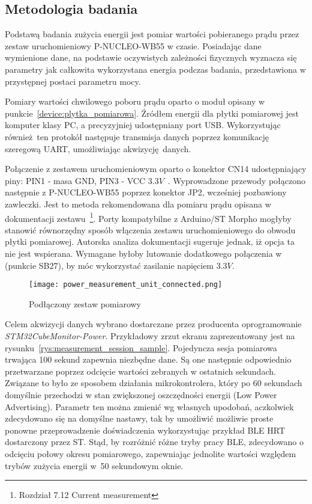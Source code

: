 \subsection{Metodologia badania}

Podstawą badania zużycia energii jest pomiar wartości pobieranego prądu przez zestaw uruchomieniowy
P-NUCLEO-WB55 w czasie. Posiadając dane wymienione dane, na podstawie oczywistych
zależności fizycznych wyznacza się parametry jak całkowita wykorzystana energia
podczas badania, przedstawiona w przystępnej postaci parametru mocy.

Pomiary wartości chwilowego poboru prądu oparto o moduł opisany w punkcie~\ref{device:plytka_pomiarowa}.
Źródłem energii dla płytki pomiarowej jest komputer klasy PC, a precyzyjniej udostępniany
port USB. Wykorzystując również ten protokół następuje transmisja danych poprzez komunikację szeregową
UART, umożliwiając akwizycję danych.

Połączenie z zestawem uruchomieniowym oparto o konektor CN14 udostępniający piny: PIN1 - masa GND, PIN3 - VCC $3.3V$~\cite{noauthor_um2243_2018}.
Wyprowadzone przewody połączono następnie z P-NUCLEO-WB55 poprzez konektor JP2, wcześniej pozbawiony zawleczki.
Jest to metoda rekomendowana dla pomiaru prądu opisana w dokumentacji zestawu~\cite{stmicroelectronics_um2435_2019}\footnote{
Rozdział 7.12 Current measurement}. Porty kompatybilne z Arduino/ST Morpho mogłyby stanowić równorzędny sposób
włączenia zestawu uruchomieniowego do obwodu płytki pomiarowej. Autorska analiza dokumentacji sugeruje jednak,
iż opcja ta nie jest wspierana. Wymagane byłoby lutowanie dodatkowego połączenia w (punkcie SB27), by móc wykorzystać
zasilanie napięciem $3.3V$.

\begin{figure}[!ht]
	\centering \texttt{[image: power\_measurement\_unit\_connected.png]}
	\caption{Podłączony zestaw pomiarowy}
	\label{rys:connected_power_measurement_unit}
\end{figure}

Celem akwizycji danych wybrano dostarczane przez producenta oprogramowanie \textit{STM32CubeMonitor-Power}.
Przykładowy zrzut ekranu zaprezentowany jest na rysunku~\ref{rys:measurement_session_sample}.
Pojedyncza sesja pomiarowa trwająca 100 sekund zapewnia niezbędne dane. Są one następnie
odpowiednio przetwarzane poprzez odcięcie wartości zebranych w ostatnich sekundach. Związane to było
ze sposobem działania mikrokontrolera, który po 60 sekundach domyślnie przechodzi w stan zwiększonej
oszczędności energii (Low Power Advertising). Parametr ten można zmienić wg własnych upodobań, aczkolwiek zdecydowano
się na domyślne nastawy, tak by umożliwić możliwie proste ponowne przeprowadzenie doświadczenia wykorzystując przykład
BLE \gls{HRT} dostarczony przez ST. Stąd, by rozróżnić różne tryby pracy \gls{BLE}, zdecydowano o odcięciu
połowy okresu pomiarowego, zapewniając jednolite wartości względem trybów zużycia energii
w~50 sekundowym oknie.

